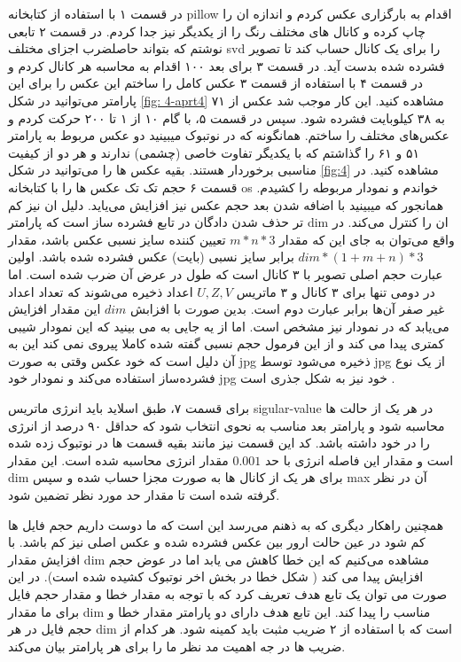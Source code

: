 \begin{prob}
\end{prob}
\begin{sol}

در قسمت ۱ با استفاده از کتابخانه pillow اقدام به بارگزاری عکس کردم و اندازه ان را چاپ کرده و کانال های مختلف رنگ را از یکدیگر نیز جدا کردم. در قسمت ۲ تابعی نوشتم که بتواند حاصلضرب اجزای مختلف svd را برای یک کانال حساب کند تا تصویر فشرده شده بدست آید. در قسمت ۳ برای بعد ۱۰۰ اقدام به محاسبه هر کانال کردم و در قسمت ۴ با استفاده از قسمت ۳ عکس کامل را ساختم این عکس را برای این پارامتر می‌توانید در شکل \ref{fig: 4-aprt4} مشاهده کنید.
این کار موجب شد عکس از ۷۱ به ۳۸ کیلوبایت فشرده شود. 
سپس در قسمت ۵، با گام ۱۰ از ۱ تا ۲۰۰ حرکت کردم و عکس‌های مختلف را ساختم. 
همانگونه که در نوتبوک میبینید دو عکس مربوط به پارامتر ۵۱ و ۶۱ را گذاشتم که با یکدیگر تفاوت خاصی (چشمی) ندارند و هر دو از کیفیت مناسبی برخوردار هستند.
بقیه عکس ها را می‌توانید در شکل \ref{fig:4} مشاهده کنید.
در قسمت ۶ حجم تک تک عکس ها را با کتابخانه os خواندم و نمودار مربوطه را کشیدم. 
همانجور که میبینید با اضافه شدن بعد حجم عکس نیز افزایش می‌یاید.
دلیل ان نیز کم تر حذف شدن دادگان در تابع فشرده ساز است که پارامتر dim ان را کنترل می‌کند.
در واقع می‌توان به جای این که مقدار $m*n*3$ تعیین کننده سایز نسبی عکس باشد، مقدار 
$ dim * (1+m+n) *3$
برابر سایز نسبی (بایت) عکس فشرده شده باشد. اولین عبارت حجم اصلی تصویر با ۳ کانال است که طول در عرض آن ضرب شده است. اما در دومی تنها برای ۳ کانال و ۳ ماتریس $U, Z, V$ اعداد ذخیره می‌شوند که تعداد اعداد غیر صفر آن‌ها برابر عبارت دوم است.
بدین صورت با افزابش $dim$ این مقدار افزایش می‌یابد که در نمودار نیز مشخص است. اما از یه جایی به می بینید که این نمودار شیبی کمتری پیدا می کند و از این فرمول حجم نسبی گفته شده کاملا پیروی نمی کند این به آن دلیل است که خود عکس وقتی به صورت jpg ذخیره می‌شود توسط jpg از یک نوع فشرده‌ساز استفاده می‌کند و نمودار خود jpg خود نیز به شکل جذری است .

برای قسمت ۷، طبق اسلاید باید انرژی ماتریس sigular-value در هر یک از حالت ها محاسبه شود و پارامتر بعد مناسب به نحوی انتخاب شود که حداقل ۹۰ درصد از انرژی را در خود داشته باشد.
کد این قسمت نیز مانند بقیه قسمت ها در نوتبوک زده شده است و مقدار این فاصله انرژی با حد $0.001$  مقدار انرژی محاسبه شده است. این مقدار dim برای هر یک از کانال ها به صورت مجزا حساب شده و سپس max آن در نظر گرفته شده است تا مقدار حد مورد نظر تضمین شود. 

همچنین راهکار دیگری که به ذهنم می‌رسد این است که ما دوست داریم حجم فایل ها کم شود در عین حالت ارور بین عکس فشرده شده و عکس اصلی نیز کم باشد. 
با افزایش مقدار dim مشاهده می‌کنیم که این خطا کاهش می یابد اما در عوض حجم افزایش پیدا می کند ( شکل خطا در بخش اخر نوتبوک کشیده شده است). 
در این صورت می توان یک تابع هدف تعریف کرد که با توجه به مقدار خطا و مقدار حجم فایل برای ما مقدار dim مناسب را پیدا کند. 
این تابع هدف دارای دو پارامتر مقدار خطا و حجم فایل در هر dim است که با استفاده از ۲ ضریب مثبت باید کمینه شود.
هر کدام از ضریب ها در جه اهمیت مد نظر ما را برای هر پارامتر بیان می‌کند.



\end{sol}
